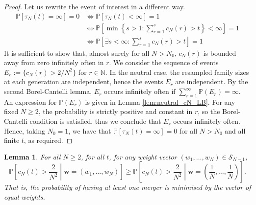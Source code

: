 \documentclass{article}
\newtheorem{lemma}{Lemma}
\newcommand{\PR}{\mathbb{P}}
\begin{document}
\begin{proof}
Let us rewrite the event of interest in a different way.
\begin{align*}
\PR[\tau_N(t) = \infty] =0 &\Leftrightarrow \PR[\tau_N(t) < \infty] =1 \\
&\Leftrightarrow \PR\left[ \min \left\{s>1 : \sum_{r=1}^s c_N(r) >t \right\} < \infty \right] =1 \\
&\Leftrightarrow \PR\left[ \exists s<\infty : \sum_{r=1}^s c_N(r) >t \right] =1
\end{align*}
It is sufficient to show that, almost surely for all $N>N_0$, $c_N(r)$ is bounded away from zero infinitely often in $r$.
We consider the sequence of events 
$E_r := \{ c_N(r) > 2/N^2 \}$ for $r \in \mathbb{N}$.
In the neutral case, the resampled family sizes at each generation are independent, hence the events $E_r$ are independent. 
By the second Borel-Cantelli lemma, $E_r$ occurs infinitely often if $\sum_{r=1}^\infty \PR(E_r) = \infty$. 
An expression for $\PR(E_r)$ is given in Lemma \ref{lem:neutral_cN_LB}. 
For any fixed $N\geq 2$, the probability is strictly positive and constant in $r$, so the Borel-Cantelli condition is satisfied, thus we conclude that $E_r$ occurs infinitely often.
Hence, taking $N_0=1$, we have that $\PR[\tau_N(t) = \infty] =0$ for all $N>N_0$ and all finite $t$, as required.
\end{proof}


\begin{lemma}\label{lem:mn_optimal_w}
For all $N\geq 2$, for all $t$, for any weight vector $(w_1, \dots, w_N) \in \mathcal{S}_{N-1}$,
\begin{equation*}
\PR \left[c_N(t) > \frac{2}{N^2} \middle| \mathbf{w}=(w_1, \dots, w_N) \right]
\geq \PR \left[c_N(t) > \frac{2}{N^2} \middle| \mathbf{w}=\left( \frac{1}{N}, \dots, \frac{1}{N} \right) \right] .
\end{equation*}
That is, the probability of having at least one merger is minimised by the vector of equal weights.
\end{lemma}
\end{document}
